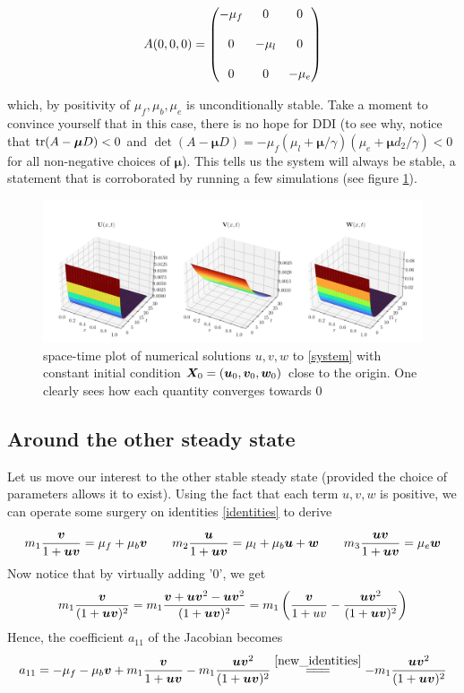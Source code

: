 $$
A(0, 0, 0) = \begin{pmatrix}  -\mu_f  &  0 & 0 \\[1.2em]
0  & -\mu_l & 0 \\[1.2em] 
0 & 0 & -\mu_e \end{pmatrix}
$$

which, by positivity of $\mu_f, \mu_b, \mu_e$ is unconditionally stable. Take a moment to convince yourself that in this case, there is no hope for DDI (to see why, notice that $\mathrm{tr} (A-\bm\mu D) < 0$ and $\det (A-\bm\mu D) = -\mu_f(\mu_l+ \bm\mu / \gamma)(\mu_e + \bm\mu d_2 / \gamma) < 0$ for all non-negative choices of $\bm\mu$). This tells us the system will always be stable, a statement that is corroborated by running a few simulations (see figure \ref{fig:simulations}).

\begin{figure}
	\centering
	\includegraphics[width=\textwidth]{figures/stable_origin.png}
	\caption{space-time plot of numerical solutions $u, v, w$ to \ref{system} with constant initial condition $\bm X_0 = (\bm{u}_0, \bm{v}_0, \bm{w}_0)$ close to the origin. One clearly sees how each quantity converges towards 0}
	\label{fig:simulations}
\end{figure}

\subsection{Around the other steady state}

Let us move our interest to the other stable steady state (provided the choice of parameters allows it to exist). Using the fact that each term $u, v, w$ is positive, we can operate some surgery on identities \ref{identities} to derive

\begin{equation}
	\label{new_identities}
		m_1 \dfrac{\bm{v}}{1 + \bm{u} \bm{v}} = \mu_f +  \mu_b \bm{v} \quad \quad
		m_2 \dfrac{\bm{u}}{1 +   \bm{u} \bm{v}}  = \mu_l +  \mu_b \bm{u} + \bm{w} \quad \quad
		m_3 \dfrac{ \bm{u} \bm{v}}{1 +  \bm{u} \bm{v}} = \mu_e \bm{w}
\end{equation}
Now notice that by virtually adding '0', we get
$$m_1 \frac{\bm{v}}{(1+\bm{u}\bm{v})^2} = m_1 \frac{\bm{v}+ \bm{u}\bm{v}^2 - \bm{u} \bm{v}^2}{(1 + \bm{u}\bm{v})^2} = m_1 \left(\frac{\bm{v}}{1+uv} - \frac{\bm{u}\bm{v}^2}{(1 + \bm{u}\bm{v})^2}\right)$$
Hence, the coefficient $a_{11}$ of the Jacobian becomes
$$a_{11} = -\mu_f - \mu_b \bm{v} + m_1 \frac{\bm{v}}{1+\bm{u}\bm{v}} - m_1 \frac{\bm{u}\bm{v}^2}{(1 + \bm{u}\bm{v})^2} \overset{\ref{new_identities}}{=\!=\!=} -m_1 \frac{\bm{u}\bm{v}^2}{(1 + \bm{u}\bm{v})^2}$$



